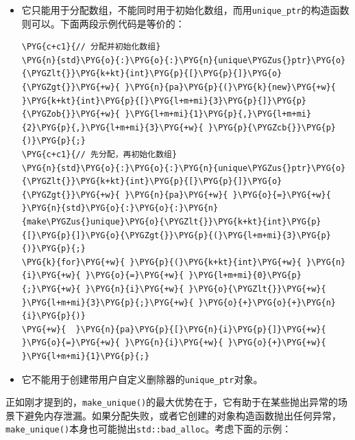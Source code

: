 \begin{itemize}
\item 它只能用于分配数组，不能同时用于初始化数组，而用\texttt{unique\_\allowbreak{}ptr}的构造函数则可以。下面两段示例代码是等价的：



\begin{codeblockbg}
\begin{Verbatim}[commandchars=\\\{\},breaklines=true,breakanywhere=true,fontsize=\codefont,xleftmargin=17bp]
\PYG{c+c1}{// 分配并初始化数组}
\PYG{n}{std}\PYG{o}{:}\PYG{o}{:}\PYG{n}{unique\PYGZus{}ptr}\PYG{o}{\PYGZlt{}}\PYG{k+kt}{int}\PYG{p}{[}\PYG{p}{]}\PYG{o}{\PYGZgt{}}\PYG{+w}{ }\PYG{n}{pa}\PYG{p}{(}\PYG{k}{new}\PYG{+w}{ }\PYG{k+kt}{int}\PYG{p}{[}\PYG{l+m+mi}{3}\PYG{p}{]}\PYG{p}{\PYGZob{}}\PYG{+w}{ }\PYG{l+m+mi}{1}\PYG{p}{,}\PYG{l+m+mi}{2}\PYG{p}{,}\PYG{l+m+mi}{3}\PYG{+w}{ }\PYG{p}{\PYGZcb{}}\PYG{p}{)}\PYG{p}{;}
\PYG{c+c1}{// 先分配，再初始化数组}
\PYG{n}{std}\PYG{o}{:}\PYG{o}{:}\PYG{n}{unique\PYGZus{}ptr}\PYG{o}{\PYGZlt{}}\PYG{k+kt}{int}\PYG{p}{[}\PYG{p}{]}\PYG{o}{\PYGZgt{}}\PYG{+w}{ }\PYG{n}{pa}\PYG{+w}{ }\PYG{o}{=}\PYG{+w}{ }\PYG{n}{std}\PYG{o}{:}\PYG{o}{:}\PYG{n}{make\PYGZus{}unique}\PYG{o}{\PYGZlt{}}\PYG{k+kt}{int}\PYG{p}{[}\PYG{p}{]}\PYG{o}{\PYGZgt{}}\PYG{p}{(}\PYG{l+m+mi}{3}\PYG{p}{)}\PYG{p}{;}
\PYG{k}{for}\PYG{+w}{ }\PYG{p}{(}\PYG{k+kt}{int}\PYG{+w}{ }\PYG{n}{i}\PYG{+w}{ }\PYG{o}{=}\PYG{+w}{ }\PYG{l+m+mi}{0}\PYG{p}{;}\PYG{+w}{ }\PYG{n}{i}\PYG{+w}{ }\PYG{o}{\PYGZlt{}}\PYG{+w}{ }\PYG{l+m+mi}{3}\PYG{p}{;}\PYG{+w}{ }\PYG{o}{+}\PYG{o}{+}\PYG{n}{i}\PYG{p}{)}
\PYG{+w}{  }\PYG{n}{pa}\PYG{p}{[}\PYG{n}{i}\PYG{p}{]}\PYG{+w}{ }\PYG{o}{=}\PYG{+w}{ }\PYG{n}{i}\PYG{+w}{ }\PYG{o}{+}\PYG{+w}{ }\PYG{l+m+mi}{1}\PYG{p}{;}
\end{Verbatim}
\end{codeblockbg}



\item 它不能用于创建带用户自定义删除器的\texttt{unique\_\allowbreak{}ptr}对象。

\end{itemize}



正如刚才提到的，\texttt{make\_\allowbreak{}unique()}的最大优势在于，它有助于在某些抛出异常的场景下避免内存泄漏。如果分配失败，或者它创建的对象构造函数抛出任何异常，\texttt{make\_\allowbreak{}unique()}本身也可能抛出\texttt{std::\allowbreak{}bad\_\allowbreak{}alloc}。考虑下面的示例：


